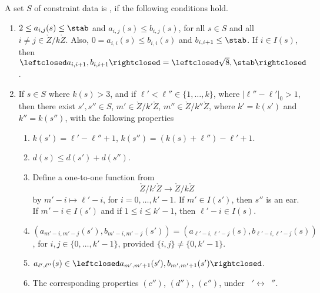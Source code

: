 \begin{definition}[coherence]
A set $S$ of constraint data is , if the following conditions
hold.
\begin{enumerate}
\item {} $2\le a_{i,j}(s)\le \stab$ and $a_{i,j}(s)\le
  b_{i,j}(s)$, for all $s\in S$ and all $i\ne j\in
  \ring{Z}/k\ring{Z}$.  Also, $0 = a_{i,i}(s)\le b_{i,i}(s)$ and
  $b_{i,i+1}\le \stab$.  If $i\in I(s)$, then $\leftclosed
  a_{i,i+1},b_{i,i+1}\rightclosed=\leftclosed\sqrt{8},\stab\rightclosed$.
\item {}
  If $s\in S$ where $k(s)>3$, and if  $\ell'<\ell''\in \{1,\ldots, k\}$, where
    $|\ell''-\ell'|_0 > 1$, then
 there exist $s',s''\in S$, $m'\in \ring{Z}/k'\ring{Z}$, $m''\in \ring{Z}/k''\ring{Z}$,
where $k'=k(s')$ and $k''=k(s'')$,
with the following
properties
\begin{enumerate}
\item  $k(s') = \ell' - \ell'' +1$,
  $k(s'') = (k(s)+\ell'')  - \ell' + 1$.
\item $d(s) \le d(s') + d(s'')$.
\item Define a one-to-one function from 
  \begin{equation}\label{eqn:injk'}
  \ring{Z}/k'\ring{Z}\to \ring{Z}/k\ring{Z}
   \end{equation}
 by $m'-i \mapsto \ell'-i$, for $i=0,\ldots,k'-1$.
If $m'\in I(s')$, then $s''$ is an ear.   If
$m'-i\in I(s')$ and if $1\le i\le k'-1$, then $\ell'-i\in I(s)$.
\item $(a_{m'-i,m'-j}(s'),b_{m'-i,m'-j}(s'))=(a_{\ell'-i,\ell'-j}(s),b_{\ell'-i,\ell'-j}(s))$,
  for $i,j\in \{0,\ldots,k'-1\}$, provided $\{i,j\}\ne \{0,k'-1\}$.
\item $a_{\ell',\ell''}(s) \in \leftclosed a_{m',m'+1}(s'),b_{m',m'+1}(s')\rightclosed$.
\item The corresponding properties $(c'')$, $(d'')$, $(e'')$, 
under $\phantom{a}'\leftrightarrow \phantom{a}''$.
\end{enumerate}
\end{enumerate}
\end{definition}

